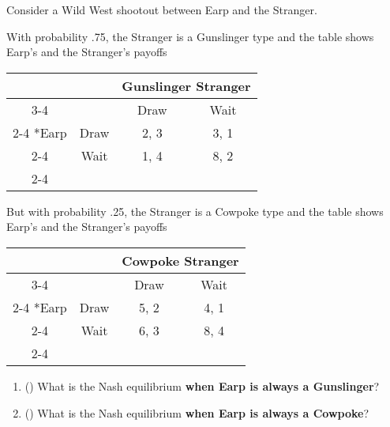 \begin{question}[type=exam]{20}
  
  Consider a Wild West shootout between Earp and the Stranger.

  With probability .75, the Stranger is a Gunslinger type and the table shows Earp's and the Stranger's payoffs
  \begin{table}[!h]
  \begin{center}
    \begin{tabular}{*{4}{c|}}
      \multicolumn{2}{c}{} &
      \multicolumn{2}{c}{Gunslinger Stranger} \\ \cline{3-4}
      \multicolumn{1}{c}{} &                & Draw & Wait \\ \cline{2-4}
      \multirow{2}*{Earp} & Draw & 2, 3 & 3, 1 \\ \cline{2-4}
                                     & Wait & 1, 4 & 8, 2 \\ \cline{2-4} 
    \end{tabular}
  \end{center}
  \end{table}

  But with probability .25, the Stranger is a Cowpoke type and the table shows Earp's and the Stranger's payoffs
  \begin{table}[!h]
  \begin{center}
    \begin{tabular}{*{4}{c|}}
      \multicolumn{2}{c}{} &
      \multicolumn{2}{c}{Cowpoke Stranger} \\ \cline{3-4}
      \multicolumn{1}{c}{} &             & Draw & Wait \\ \cline{2-4}
      \multirow{2}*{Earp} & Draw & 5, 2 & 4, 1 \\ \cline{2-4}
                                  & Wait & 6, 3 & 8, 4 \\ \cline{2-4} 
    \end{tabular}
  \end{center}
  \end{table}
  \begin{enumerate}[label=\Alph*)]
    
    \item () 
    What is the Nash equilibrium \textbf{when Earp is always a Gunslinger}?
    \vspace{2cm}

    \item ()
    What is the Nash equilibrium \textbf{when Earp is always a Cowpoke}?
    \vspace{2cm}


\end{enumerate}
\end{question}
